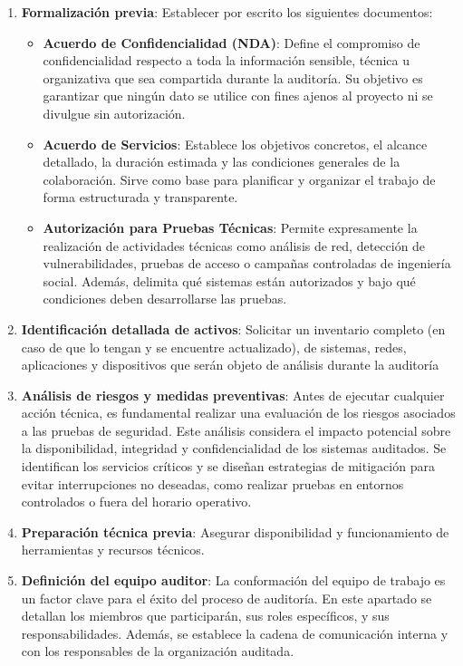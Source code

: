 \documentclass[a4paper, 11pt]{article}
\begin{document}
\begin{enumerate}
\item \textbf{Formalización previa}: Establecer por escrito los siguientes documentos:

\begin{itemize}
\item \textbf{Acuerdo de Confidencialidad (NDA)}: Define el compromiso de confidencialidad respecto a toda la información sensible, técnica u organizativa que sea compartida durante la auditoría. Su objetivo es garantizar que ningún dato se utilice con fines ajenos al proyecto ni se divulgue sin autorización.

\item \textbf{Acuerdo de Servicios}: Establece los objetivos concretos, el alcance detallado, la duración estimada y las condiciones generales de la colaboración. Sirve como base para planificar y organizar el trabajo de forma estructurada y transparente.

\item \textbf{Autorización para Pruebas Técnicas}: Permite expresamente la realización de actividades técnicas como análisis de red, detección de vulnerabilidades, pruebas de acceso o campañas controladas de ingeniería social. Además, delimita qué sistemas están autorizados y bajo qué condiciones deben desarrollarse las pruebas.

\end{itemize}

\item \textbf{Identificación detallada de activos}: Solicitar un inventario completo (en caso de que lo tengan y se encuentre actualizado), de sistemas, redes, aplicaciones y dispositivos que serán objeto de análisis durante la auditoría
\item \textbf{Análisis de riesgos y medidas preventivas}: Antes de ejecutar cualquier acción técnica, es fundamental realizar una evaluación de los riesgos asociados a las pruebas de seguridad. Este análisis considera el impacto potencial sobre la disponibilidad, integridad y confidencialidad de los sistemas auditados. Se identifican los servicios críticos y se diseñan estrategias de mitigación para evitar interrupciones no deseadas, como realizar pruebas en entornos controlados o fuera del horario operativo.

\item \textbf{Preparación técnica previa}: Asegurar disponibilidad y funcionamiento de herramientas y recursos técnicos.
\item \textbf{Definición del equipo auditor}: La conformación del equipo de trabajo es un factor clave para el éxito del proceso de auditoría. En este apartado se detallan los miembros que participarán, sus roles específicos, y sus responsabilidades. Además, se establece la cadena de comunicación interna y con los responsables de la organización auditada.
\end{enumerate}
\end{document}

